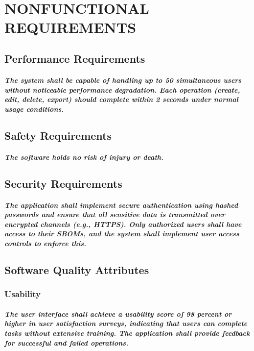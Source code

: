 \documentclass[letterpaper,12pt,oneside,listof=totoc]{scrreprt}
\begin{document}
\chapter{NONFUNCTIONAL REQUIREMENTS}

\section{Performance Requirements}
\paragraph{ \normalfont
The system shall be capable of handling up to 50 simultaneous users without noticeable performance degradation. Each operation (create, edit, delete, export) should complete within 2 seconds under normal usage conditions.
}

\section{Safety Requirements}
\paragraph{ \normalfont
The software holds no risk of injury or death.
}

\section{Security Requirements}
\paragraph{ \normalfont
The application shall implement secure authentication using hashed passwords and ensure that all sensitive data is transmitted over encrypted channels (e.g., HTTPS). Only authorized users shall have access to their SBOMs, and the system shall implement user access controls to enforce this.
}

\section{Software Quality Attributes}
\subsection{Usability}
\paragraph{ \normalfont
The user interface shall achieve a usability score of 98 percent or higher in user satisfaction surveys, indicating that users can complete tasks without extensive training. The application shall provide feedback for successful and failed operations.
}
\end{document}
